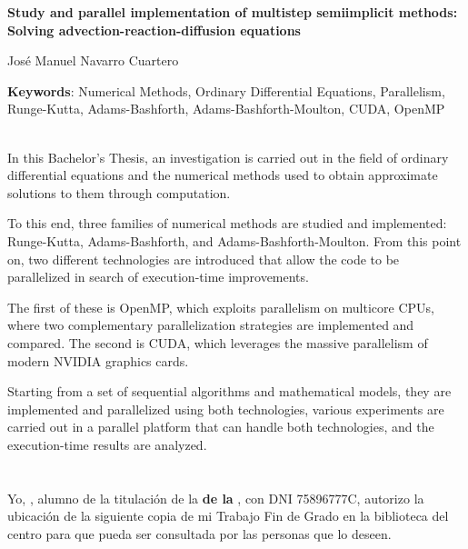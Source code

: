 \thispagestyle{empty}


\begin{center}
{\large\bfseries Study and parallel implementation of multistep semi\text{-}implicit methods: Solving advection-reaction-diffusion equations}\\
\end{center}
\begin{center}
José Manuel Navarro Cuartero\\
\end{center}

\noindent\textbf{Keywords}: Numerical Methods, Ordinary Differential Equations, Parallelism, Runge-Kutta, Adams-Bashforth, Adams-Bashforth-Moulton, CUDA, OpenMP


\vspace{0.7cm}
\\

In this Bachelor's Thesis, an investigation is carried out in the field of ordinary differential equations and the numerical methods used to obtain approximate solutions to them through computation.

To this end, three families of numerical methods are studied and implemented: Runge-Kutta, Adams-Bashforth, and Adams-Bashforth-Moulton. From this point on, two different technologies are introduced that allow the code to be parallelized in search of execution-time improvements.

The first of these is OpenMP, which exploits parallelism on multicore CPUs, where two complementary parallelization strategies are implemented and compared. The second is CUDA, which leverages the massive parallelism of modern NVIDIA graphics cards.

Starting from a set of sequential algorithms and mathematical models, they are implemented and parallelized using both technologies, various experiments are carried out in a parallel platform that can  handle both technologies, and the execution-time results are analyzed.


\chapter*{}
\thispagestyle{empty}


Yo, \textbf{\myName}, alumno de la titulación \textbf{\myDegree} de la \textbf{{\myFaculty} de la {\myUni}}, con DNI 75896777C, autorizo la ubicación de la siguiente copia de mi Trabajo Fin de Grado en la biblioteca del centro para que pueda ser consultada por las personas que lo deseen.

